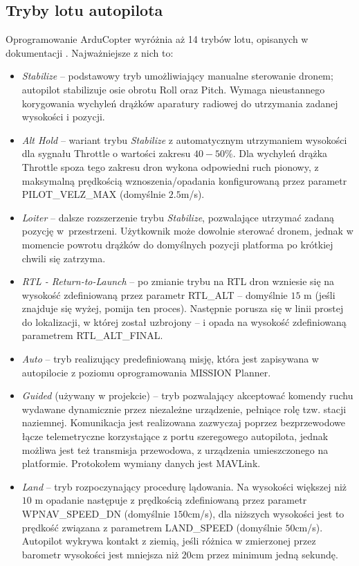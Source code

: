 \subsection{Tryby lotu autopilota}
\label{flightmodes}
Oprogramowanie ArduCopter wyróżnia aż 14 trybów lotu, opisanych w dokumentacji \cite{FlightModes}. 
Najważniejsze z nich to:
\begin{itemize}
	\item \textit{Stabilize} -- podstawowy tryb umożliwiający manualne sterowanie dronem; autopilot stabilizuje osie obrotu Roll oraz Pitch. 
	Wymaga nieustannego korygowania wychyleń drążków aparatury radiowej do utrzymania zadanej wysokości i pozycji.
	\item \textit{Alt Hold} -- wariant trybu \textit{Stabilize} z automatycznym utrzymaniem wysokości dla sygnału Throttle o wartości zakresu $40-50\%$. 
	Dla wychyleń drążka Throttle spoza tego zakresu dron wykona odpowiedni ruch pionowy, z maksymalną prędkością wznoszenia/opadania konfigurowaną przez parametr PILOT\_VELZ\_MAX (domyślnie $2.5$m/s).
	\item \textit{Loiter} -- dalsze rozszerzenie trybu \textit{Stabilize}, pozwalające utrzymać zadaną pozycję w~przestrzeni. Użytkownik może dowolnie sterować dronem, jednak w momencie powrotu drążków do domyślnych pozycji platforma po krótkiej chwili się zatrzyma. %
	\item \textit{RTL - Return-to-Launch} -- po zmianie trybu na RTL dron wzniesie się na wysokość zdefiniowaną przez parametr RTL\_ALT -- domyślnie $15$ m (jeśli znajduje się wyżej, pomija ten proces). Następnie porusza się w linii prostej do lokalizacji, w której został uzbrojony -- i opada na wysokość zdefiniowaną parametrem RTL\_ALT\_FINAL.
	\item \textit{Auto} -- tryb realizujący predefiniowaną misję, która jest zapisywana w autopilocie z poziomu oprogramowania MISSION Planner.
	\item \textit{Guided} (używany w projekcie) -- tryb pozwalający akceptować komendy ruchu  wydawane dynamicznie przez niezależne urządzenie, pełniące rolę tzw. stacji naziemnej. Komunikacja jest realizowana zazwyczaj poprzez bezprzewodowe łącze telemetryczne korzystające z portu szeregowego autopilota, jednak możliwa jest też transmisja przewodowa, z urządzenia umieszczonego na platformie. Protokołem wymiany danych jest MAVLink. %
	\item \textit{Land} -- tryb rozpoczynający procedurę lądowania. Na wysokości większej niż $10$ m opadanie następuje z prędkością zdefiniowaną przez parametr WPNAV\_SPEED\_DN (domyślnie $150$cm/s), dla niższych wysokości jest to prędkość związana z parametrem LAND\_SPEED (domyślnie $50$cm/s). Autopilot wykrywa kontakt z ziemią, jeśli różnica w zmierzonej przez barometr wysokości jest mniejsza niż $20$cm przez minimum jedną sekundę.
\end{itemize}

